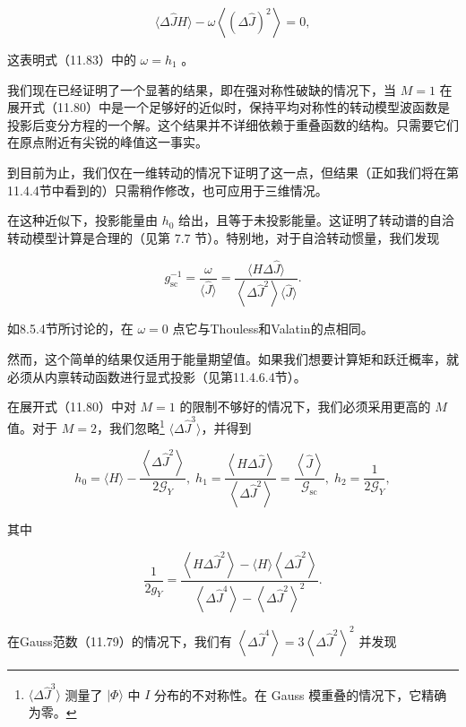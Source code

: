 \[
\langle\Delta\widehat{J}H\rangle-\omega\left\langle {\left(\Delta\widehat{J}\right)}^{2}\right\rangle =0,
\]

这表明式（11.83）中的 $\omega={h}_{1}$ 。

我们现在已经证明了一个显著的结果，即在强对称性破缺的情况下，当 $M=1$ 在展开式（11.80）中是一个足够好的近似时，保持平均对称性的转动模型波函数是投影后变分方程的一个解。这个结果并不详细依赖于重叠函数的结构。只需要它们在原点附近有尖锐的峰值这一事实。

到目前为止，我们仅在一维转动的情况下证明了这一点，但结果（正如我们将在第11.4.4节中看到的）只需稍作修改，也可应用于三维情况。

在这种近似下，投影能量由 ${h}_{0}$ 给出，且等于未投影能量。这证明了转动谱的自洽转动模型计算是合理的（见第 7.7 节）。特别地，对于自洽转动惯量，我们发现

\[
{g}^{-1}_{\mathrm{{sc}}}=\frac{\omega}{\langle\widehat{J}\rangle}=\frac{\langle{H\Delta}\widehat{J}\rangle}{\left\langle {\Delta{\widehat{J}}^{2}}\right\rangle \langle\widehat{J}\rangle}.\tag{11.87}
\]

如8.5.4节所讨论的，在 $\omega=0$ 点它与Thouless和Valatin的点相同。

然而，这个简单的结果仅适用于能量期望值。如果我们想要计算矩和跃迁概率，就必须从内禀转动函数进行显式投影（见第11.4.6.4节）。

在展开式（11.80）中对 $M=1$ 的限制不够好的情况下，我们必须采用更高的 $M$ 值。对于 $M=2$，我们忽略\footnote{$\langle\Delta\hat{J}^{3}\rangle$ 测量了 $|\Phi\rangle$ 中 $I$ 分布的不对称性。在
Gauss 模重叠的情况下，它精确为零。} $\langle\Delta\hat{J}^{3}\rangle$，并得到

\[
{h}_{0}=\langle H\rangle-\frac{\left\langle \Delta{\widehat{J}}^{2}\right\rangle }{2{\mathcal{G}}_{Y}},\;{h}_{1}=\frac{\left\langle H\Delta\widehat{J}\right\rangle }{\left\langle \Delta{\widehat{J}}^{2}\right\rangle }=\frac{\left\langle \widehat{J}\right\rangle }{{\mathcal{G}}_{\mathrm{{sc}}}},\;{h}_{2}=\frac{1}{2{\mathcal{G}}_{Y}},\tag{11.88}
\]

其中

\[
\frac{1}{2{g}_{Y}}=\frac{\left\langle {{H\Delta}{\widehat{J}}^{2}}\right\rangle -\langle H\rangle\left\langle {\Delta{\widehat{J}}^{2}}\right\rangle }{\left\langle {\Delta{\widehat{J}}^{4}}\right\rangle -{\left\langle \Delta{\widehat{J}}^{2}\right\rangle }^{2}}.\tag{11.89}
\]

在Gauss范数（11.79）的情况下，我们有 $\left\langle {\Delta{\widehat{J}}^{4}}\right\rangle =3{\left\langle \Delta{\widehat{J}}^{2}\right\rangle }^{2}$
并发现

